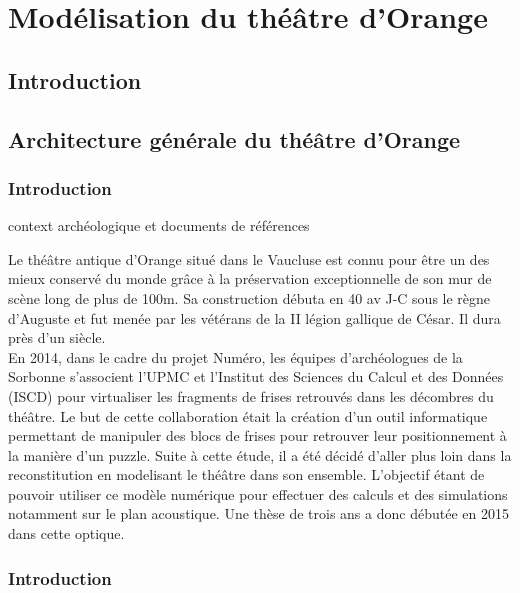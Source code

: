 \part{Modélisation du théâtre d’Orange}

	\chapter*{Introduction}

	\chapter{Architecture générale du théâtre d'Orange}
		\minitoc
		\newpage
		
		\section{Introduction}
		context archéologique et documents de références
		
		 Le théâtre antique d'Orange situé dans le Vaucluse est connu pour être un des mieux conservé du monde grâce à la préservation exceptionnelle de son mur de scène long de plus de 100m. Sa construction débuta en 40 av J-C sous le règne d'Auguste et fut menée par les vétérans de la II légion gallique de César. Il dura près d'un siècle.
		 \\
 
		En 2014, dans le cadre du projet Numéro, les équipes d'archéologues de la Sorbonne s'associent l'UPMC et l'Institut des Sciences du Calcul et des Données (ISCD) pour virtualiser les fragments de frises retrouvés dans les décombres du théâtre. Le but de cette collaboration était la création d'un outil informatique permettant de manipuler des blocs de frises pour retrouver leur positionnement à la manière d'un puzzle.
		Suite à cette étude, il a été décidé d'aller plus loin dans la reconstitution en modelisant le théâtre dans son ensemble. L'objectif étant de pouvoir utiliser ce modèle numérique pour effectuer des calculs et des simulations notamment sur le plan acoustique. Une thèse de trois ans a donc débutée en 2015 dans cette optique.
		
		\section{Introduction}

